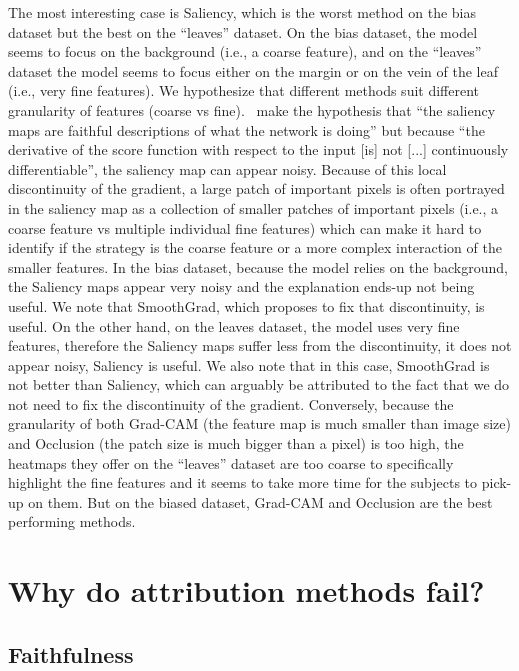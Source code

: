 The most interesting case is Saliency, which is the worst method on the bias dataset but the best on the “leaves” dataset. On the bias dataset, the model seems to focus on the background (i.e., a coarse feature), and on the “leaves'' dataset the model seems to focus either on the margin or on the vein of the leaf (i.e., very fine features). We hypothesize that different methods suit different granularity of features (coarse vs fine). \cite{smilkov2017smoothgrad}~make the hypothesis that “the saliency maps are faithful descriptions of what the network is doing” but because “the derivative of the score function with respect to the input [is] not [...] continuously differentiable”, the saliency map can appear noisy. Because of this local discontinuity of the gradient, a large patch of important pixels is often portrayed in the saliency map as a collection of smaller patches of important pixels (i.e., a coarse feature vs multiple individual fine features) which can make it hard to identify if the strategy is the coarse feature or a more complex interaction of the smaller features. In the bias dataset, because the model relies on the background, the Saliency maps appear very noisy and the explanation ends-up not being useful. We note that SmoothGrad, which proposes to fix that discontinuity, is useful. On the other hand, on the leaves dataset, the model uses very fine features, therefore the Saliency maps suffer less from the discontinuity, it does not appear noisy, Saliency is useful. We also note that in this case, SmoothGrad is not better than Saliency, which can arguably be attributed to the fact that we do not need to fix the discontinuity of the gradient. Conversely, because the granularity of both Grad-CAM (the feature map is much smaller than image size) and Occlusion (the patch size is much bigger than a pixel) is too high, the heatmaps they offer on the “leaves” dataset are too coarse to specifically highlight the fine features and it seems to take more time for the subjects to pick-up on them. But on the biased dataset, Grad-CAM and Occlusion are the best performing methods.


\section{Why do attribution methods fail?}

\subsection{Faithfulness}

